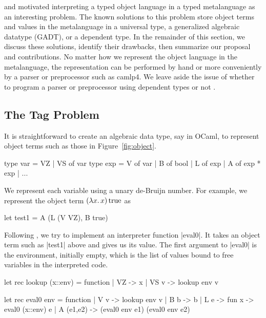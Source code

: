 \documentclass[preprint]{sigplanconf}
\newcommand{\oleg}[1]{{\it [Oleg says: #1]}}
\newcommand{\fun}[1]{\mathopen{\lambda\mathord{#1}.\,}}
\newcommand{\True}{\mathinner{\mathrm{true}}}
\begin{document}
 and \citet{xi-guarded} motivated interpreting
a typed object language in a typed metalanguage as an interesting
problem.  The known solutions to this problem store object terms and
values in the metalanguage in a universal type, a generalized algebraic
datatype (GADT), or a dependent type.  In the remainder of this section,
we discuss these solutions, identify their drawbacks, then summarize our
proposal and contributions.  No matter how we represent the object language in the
metalanguage, the representation can be performed by hand or more
conveniently by a parser or preprocessor such as camlp4.  We leave aside
the issue of whether to program a parser or preprocessor using dependent
types \citep{WalidICFP02} or not \citep{baars-typing}.

\subsection{The Tag Problem}\label{tagproblem}


It is straightforward to create an algebraic data type, say in OCaml, to
represent object terms such as those in Figure~\ref{fig:object}.
\begin{code}
type var = VZ | VS of var
type exp = V of var | B of bool
         | L of exp | A of exp * exp | ...
\end{code}
We represent each variable using a unary de-Bruijn number.
For example, we represent the object term $(\fun{x}x)\True$ as
\begin{code}
let test1 = A (L (V VZ), B true)
\end{code}

Following \citet{WalidICFP02},
we try to implement an interpreter function |eval0|. It takes
an object term such as |test1| above and gives us its value.
The first argument to |eval0| is the environment, initially empty,
which is the list of values bound to free variables in the
interpreted code.
\begin{code}
let rec lookup (x::env) = function
| VZ   -> x
| VS v -> lookup env v

let rec eval0 env = function 
| V v       -> lookup env v
| B b       -> b 
| L e       -> fun x -> eval0 (x::env) e
| A (e1,e2) -> (eval0 env e1) (eval0 env e2) 
\end{code}
\end{document}
